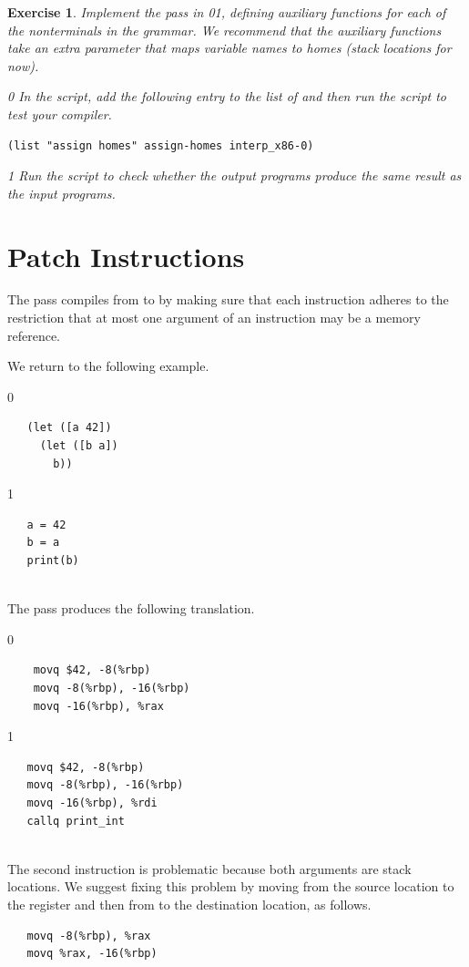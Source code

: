 \documentclass[7x10]{TimesAPriori_MIT}%
\def\racketEd{0}
\def\pythonEd{1}
\providecommand{\BookEdition}{1}
\let\edition\BookEdition
\newcommand{\racket}[1]{{\if\edition\racketEd{#1}\fi}}
\newcommand{\pythonColor}[0]{}
\newcommand{\python}[1]{{\if\edition\pythonEd\pythonColor #1\fi}}
\newtheorem{exercise}[theorem]{Exercise}
\numberwithin{theorem}{chapter}
\numberwithin{definition}{chapter}
\numberwithin{equation}{chapter}
\begin{document}
\begin{exercise}\normalfont\normalsize
Implement the  pass in
\racket{}\python{}, defining
auxiliary functions for each of the nonterminals in the \LangXVar{}
grammar.  We recommend that the auxiliary functions take an extra
parameter that maps variable names to homes (stack locations for now).
%
{\if\edition\racketEd
In the  script, add the following entry to the
list of  and then run the script to test your compiler.
\begin{lstlisting}
(list "assign homes" assign-homes interp_x86-0)
\end{lstlisting}
\fi}
{\if\edition\pythonEd\pythonColor
Run the  script to check
whether the output programs produce the same result as the input
programs.
\fi}
\end{exercise}


\section{Patch Instructions}
\label{sec:patch-s0}

The  pass compiles from \LangXVar{} to
\LangXInt{} by making sure that each instruction adheres to the
restriction that at most one argument of an instruction may be a
memory reference. 

We return to the following example.\\
\begin{minipage}{0.5\textwidth}
{\if\edition\racketEd
\begin{lstlisting}
   (let ([a 42])
     (let ([b a])
       b))
\end{lstlisting}
\fi}
{\if\edition\pythonEd\pythonColor
\begin{lstlisting}
   a = 42
   b = a
   print(b)
\end{lstlisting}
\fi}
\end{minipage}\\
The  pass produces the following translation. \\
\begin{minipage}{0.5\textwidth}
{\if\edition\racketEd
\begin{lstlisting}
    movq $42, -8(%rbp)
    movq -8(%rbp), -16(%rbp)
    movq -16(%rbp), %rax
\end{lstlisting}
\fi}
{\if\edition\pythonEd\pythonColor
\begin{lstlisting}
   movq $42, -8(%rbp)
   movq -8(%rbp), -16(%rbp)
   movq -16(%rbp), %rdi
   callq print_int
\end{lstlisting}
\fi}
\end{minipage}\\
The second  instruction is problematic because both
arguments are stack locations. We suggest fixing this problem by
moving from the source location to the register  and then
from  to the destination location, as follows.
\begin{lstlisting}
   movq -8(%rbp), %rax
   movq %rax, -16(%rbp)
\end{lstlisting}
\end{document}
